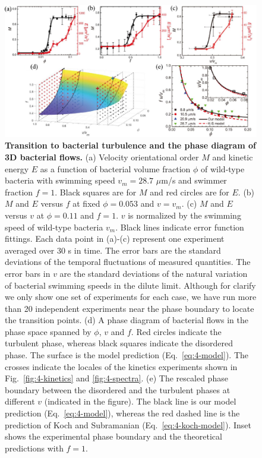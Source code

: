 \begin{figure}[!hp]
	\begin{center}
	\includegraphics[width=5.5 in]{Figs/4-Emergence/2.pdf}
	\end{center}
	\caption[Transition to Bacterial Turbulence and the Phase Diagram of 3D Bacterial Flows]
	{
	\textbf{Transition to bacterial turbulence and the phase diagram of 3D bacterial flows.}
   (a) Velocity orientational order $M$ and kinetic energy $E$ as a function of bacterial volume fraction $\phi$ of wild-type bacteria with swimming speed $v_m = 28.7$ $\mu$m/s and swimmer fraction $f = 1$. Black squares are for $M$ and red circles are for $E$.
   (b) $M$ and $E$ versus $f$ at fixed $\phi= 0.053$ and $v = v_m$.
   (c) $M$ and $E$ versus $v$ at $\phi = 0.11$ and $f = 1$. $v$ is normalized by the swimming speed of wild-type bacteria $v_m$. Black lines indicate error function fittings. Each data point in (a)-(c) represent one experiment averaged over 30 s in time. The error bars are the standard deviations of the temporal fluctuations of measured quantities. The error bars in $v$ are the standard deviations of the natural variation of bacterial swimming speeds in the dilute limit. Although for clarify we only show one set of experiments for each case, we have run more than 20 independent experiments near the phase boundary to locate the transition points.
   (d) A phase diagram of bacterial flows in the phase space spanned by $\phi$, $v$ and $f$. Red circles indicate the turbulent phase, whereas black squares indicate the disordered phase. The surface is the model prediction (Eq.~\ref{eq:4-model}). The crosses indicate the locales of the kinetics experiments shown in Fig.~\ref{fig:4-kinetics} and \ref{fig:4-spectra}.
   (e) The rescaled phase boundary between the disordered and the turbulent phases at different $v$ (indicated in the figure). The black line is our model prediction (Eq.~\ref{eq:4-model}), whereas the red dashed line is the prediction of Koch and Subramanian (Eq.~\ref{eq:4-koch-model}). Inset shows the experimental phase boundary and the theoretical predictions with $f = 1$.
	}
	\label{fig:4-transition}
\end{figure}

